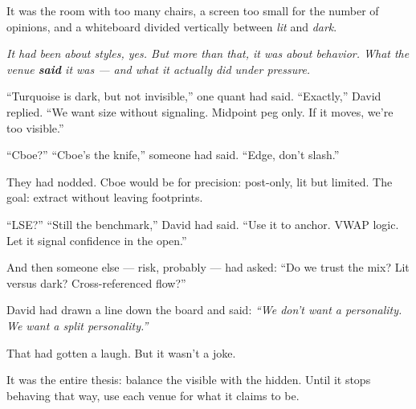 \medskip



It was the room with too many chairs, a screen too small for the number of opinions,
and a whiteboard divided vertically between \textit{lit} and \textit{dark}.

\textit{It had been about styles, yes. But more than that, it was about behavior.
What the venue \textbf{said} it was — and what it actually did under pressure.}


``Turquoise is dark, but not invisible,'' one quant had said.
``Exactly,'' David replied. ``We want size without signaling. Midpoint peg only. If it moves, 
we’re too visible.''

``Cboe?''
``Cboe’s the knife,'' someone had said. ``Edge, don’t slash.''

They had nodded. Cboe would be for precision: post-only, lit but limited.
The goal: extract without leaving footprints.

``LSE?''
``Still the benchmark,'' David had said. ``Use it to anchor. VWAP logic. Let it signal 
confidence in the open.''

And then someone else --- risk, probably --- had asked:
``Do we trust the mix? Lit versus dark? Cross-referenced flow?''

David had drawn a line down the board and said:
\textit{``We don’t want a personality. We want a split personality.''}

That had gotten a laugh. But it wasn’t a joke.

It was the entire thesis: balance the visible with the hidden.
Until it stops behaving that way, use each venue for what it claims to be.

\medskip

\renewcommand{\arraystretch}{1.4}  %

\begin{table}[H]
\centering
{}
\caption{Mapping of Venues to Execution Styles, Behaviors, and Risk Profiles}
\end{table}

